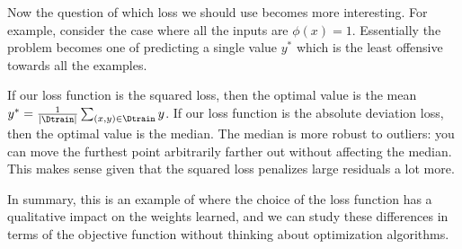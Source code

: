 Now the question of which loss we should use becomes more interesting.
For example, consider the case where all the inputs are $\phi(x) = 1$.
Essentially the problem becomes one of predicting a single value $y^*$ which is the least offensive towards all the examples.

If our loss function is the squared loss, then the optimal value is the mean $y^* = \frac{1}{|\Dtrain|} \sum_{(x,y) \in \Dtrain} y$.
If our loss function is the absolute deviation loss, then the optimal value is the median.
The median is more robust to outliers: you can move the furthest point arbitrarily farther out without affecting the median.
This makes sense given that the squared loss penalizes large residuals a lot more.

In summary, this is an example of where the choice of the loss function has a qualitative impact on the weights learned,
and we can study these differences in terms of the objective function without thinking about optimization algorithms.

